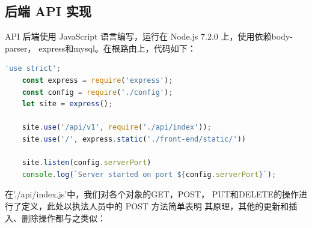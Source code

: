 \documentclass[a4paper, 12pt]{article}
\begin{document}
	\subsection{\normalfont 后端 API 实现}
	
	API 后端使用 JavaScript 语言编写，运行在 Node.js 7.2.0 上，使用依赖{\inlinecode body-parser}，
	{\inlinecode express}和{\inlinecode mysql}。在根路由上，代码如下：

	\begin{lstlisting}[language=javascript, basicstyle=\small\lstfont, showstringspaces=false]
	'use strict';
	const express = require('express');
	const config = require('./config');
	let site = express();

	site.use('/api/v1', require('./api/index'));
	site.use('/', express.static('./front-end/static/'))

	site.listen(config.serverPort)
	console.log(`Server started on port ${config.serverPort}`);
	\end{lstlisting}

	在{\inlinecode './api/index.js'}中，我们对各个对象的{\inlinecode GET}，{\inlinecode POST}，
	{\inlinecode PUT}和{\inlinecode DELETE}的操作进行了定义，此处以执法人员中的 POST 方法简单表明
	其原理，其他的更新和插入、删除操作都与之类似：
\end{document}
